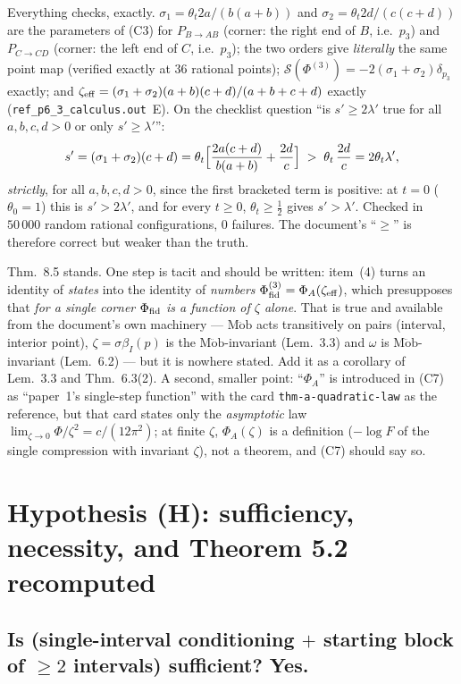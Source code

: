 \documentclass[11pt]{article}
\newcommand{\Sch}{\mathcal S}
\newcommand{\Mob}{\operatorname{M\ddot ob}}
\newcommand{\bI}{\beta_I}
\theoremstyle{definition}\newtheorem{example}[theorem]{Example}
\begin{document}
Everything checks, exactly.  $\sigma_1=\theta_t2a/(b(a+b))$ and
$\sigma_2=\theta_t2d/(c(c+d))$ are the parameters of (C3) for $P_{B\to AB}$ (corner: the
right end of $B$, i.e.\ $p_3$) and $P_{C\to CD}$ (corner: the left end of $C$, i.e.\
$p_3$); the two orders give \emph{literally} the same point map (verified exactly at $36$
rational points); $\Sch(\Phi^{(3)})=-2(\sigma_1+\sigma_2)\delta_{p_3}$ exactly; and
$\zeta_{\rm eff}=(\sigma_1+\sigma_2)(a+b)(c+d)/(a+b+c+d)$ exactly
(\texttt{ref\_p6\_3\_calculus.out}~E).  On the checklist question ``is $s'\ge2\lambda'$
true for all $a,b,c,d>0$ or only $s'\ge\lambda'$'':
\[
 s'=(\sigma_1+\sigma_2)(c+d)
 =\theta_t\Bigl[\frac{2a(c+d)}{b(a+b)}+\frac{2d}c\Bigr]
 \;>\;\theta_t\,\frac{2d}c=2\theta_t\lambda' ,
\]
\emph{strictly}, for all $a,b,c,d>0$, since the first bracketed term is positive: at
$t=0$ ($\theta_0=1$) this is $s'>2\lambda'$, and for every $t\ge0$, $\theta_t\ge\frac12$
gives $s'>\lambda'$.  Checked in $50\,000$ random rational configurations, $0$ failures.
The document's ``$\ge$'' is therefore correct but weaker than the truth.

\begin{verdictok}
Thm.~8.5 stands.  One step is tacit and should be written: item~(4) turns an identity of
\emph{states} into the identity of \emph{numbers} $\Phi^{(3)}_{\rm fid}=\Phi_A(\zeta_{\rm
eff})$, which presupposes that \emph{for a single corner $\Phi_{\rm fid}$ is a function of
$\zeta$ alone}.  That is true and available from the document's own machinery ---
$\Mob$ acts transitively on pairs (interval, interior point), $\zeta=\sigma\bI(p)$ is the
$\Mob$-invariant (Lem.~3.3) and $\omega$ is $\Mob$-invariant (Lem.~6.2) --- but it is
nowhere stated.  Add it as a corollary of Lem.~3.3 and Thm.~6.3(2).  A second, smaller
point: ``$\Phi_A$'' is introduced in (C7) as ``paper~1's single-step function'' with the
card \texttt{thm-a-quadratic-law} as the reference, but that card states only the
\emph{asymptotic} law $\lim_{\zeta\to0}\Phi/\zeta^2=c/(12\pi^2)$; at finite $\zeta$,
$\Phi_A(\zeta)$ is a definition ($-\log F$ of the single compression with invariant
$\zeta$), not a theorem, and (C7) should say so.
\end{verdictok}


\section{Hypothesis (H): sufficiency, necessity, and Theorem 5.2 recomputed}\label{sec:H}

\subsection{Is (single-interval conditioning $+$ starting block of $\ge2$ intervals)
sufficient?  Yes.}
\end{document}
